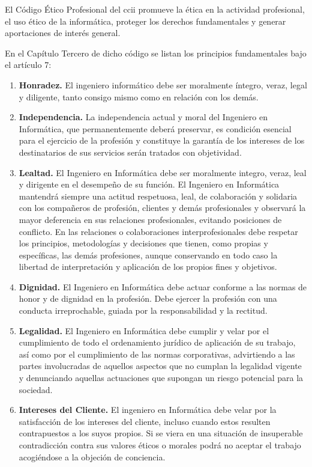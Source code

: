 El Código Ético Profesional del \gls{ccii} promueve la ética en la actividad profesional, el uso ético de la informática, proteger los derechos fundamentales y generar aportaciones de interés general.

En el Capítulo Tercero de dicho código se listan los principios fundamentales bajo el artículo 7:
\begin{enumerate}[label=\textbf{\arabic*.}]
    \item\textbf{Honradez.} El ingeniero informático debe ser moralmente íntegro, veraz, legal y diligente, tanto consigo mismo como en relación con los demás.
    \item\textbf{Independencia.} La independencia actual y moral del Ingeniero en Informática, que permanentemente deberá preservar, es condición esencial para el ejercicio de la profesión y constituye la garantía de los intereses de los destinatarios de sus servicios serán tratados con objetividad.
    \item\textbf{Lealtad.} El Ingeniero en Informática debe ser moralmente integro, veraz, leal y dirigente en el desempeño de su función. El Ingeniero en Informática mantendrá siempre una actitud respetuosa, leal, de colaboración y solidaria con los compañeros de profesión, clientes y demás profesionales y observará la mayor deferencia en sus relaciones profesionales, evitando posiciones de conflicto. En las relaciones o colaboraciones interprofesionales debe respetar los principios, metodologías y decisiones que tienen, como propias y específicas, las demás profesiones, aunque conservando en todo caso la libertad de interpretación y aplicación de los propios fines y objetivos.
    \item\textbf{Dignidad.} El Ingeniero en Informática debe actuar conforme a las normas de honor y de dignidad en la profesión. Debe ejercer la profesión con una conducta irreprochable, guiada por la responsabilidad y la rectitud.
    \item\textbf{Legalidad.} El Ingeniero en Informática debe cumplir y velar por el cumplimiento de todo el ordenamiento jurídico de aplicación de su trabajo, así como por el cumplimiento de las normas corporativas, advirtiendo a las partes involucradas de aquellos aspectos que no cumplan la legalidad vigente y denunciando aquellas actuaciones que supongan un riesgo potencial para la sociedad.
    \item\textbf{Intereses del Cliente.} El ingeniero en Informática debe velar por la satisfacción de los intereses del cliente, incluso cuando estos resulten contrapuestos a los suyos propios. Si se viera en una situación de insuperable contradicción contra sus valores éticos o morales podrá no aceptar el trabajo acogiéndose a la objeción de conciencia.

\end{enumerate}
